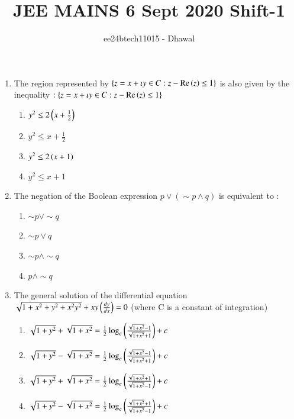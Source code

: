 \documentclass[journal]{IEEEtran}
\theoremstyle{remark}
\begin{document}

\onecolumn

\title{JEE MAINS 6 Sept 2020 Shift-1}
\author{ee24btech11015 - Dhawal}
\maketitle

\renewcommand{\thefigure}{\theenumi}
\renewcommand{\thetable}{\theenumi}

\begin{enumerate}
	\item The region represented by $\left\{ z = x+ \iota y  \in C : z - \text{Re} \left(z\right) \leq 1\right\}$ is also given by the inequality $: \left\{z = x + \iota y \in C : z -\text{Re} \left(z\right) \leq 1\right\}$

\begin{multicols}{4}
\begin{enumerate}
\item $y^2 \leq 2\left(x + \frac{1}{2}\right)$
\item $y^2 \leq x + \frac{1}{2}$
\item $y^2 \leq 2\left(x + 1\right)$
\item $y^2 \leq x + 1$
\end{enumerate}
\end{multicols}

\item  The negation of the Boolean expression $p \lor (\sim p \land q)$ is equivalent to :

\begin{multicols}{4}
\begin{enumerate}
\item $\sim p \lor  \sim q$
\item $\sim p \lor q$
\item $\sim p \land \sim q$
\item $p \land \sim q$
\end{enumerate}
\end{multicols}

\item  The general solution of the differential equation $\sqrt{1+x^2+y^2+x^2y^2}+xy\left(\frac{dy}{dx}\right) = 0$ (where C is a constant of integration)
\begin{enumerate}
\item $\sqrt{1 + y^2} + \sqrt{1 + x^2} = \frac{1}{2} \log_e \left( \frac{\sqrt{1 + x^2} - 1}{\sqrt{1 + x^2} + 1} \right) + c $
\item $\sqrt{1 + y^2} - \sqrt{1 + x^2} = \frac{1}{2} \log_e \left( \frac{\sqrt{1 + x^2} - 1}{\sqrt{1 + x^2} + 1} \right) + c $
\item $\sqrt{1 + y^2} + \sqrt{1 + x^2} = \frac{1}{2} \log_e \left( \frac{\sqrt{1 + x^2} + 1}{\sqrt{1 + x^2} - 1} \right) + c $
\item $\sqrt{1 + y^2} - \sqrt{1 + x^2} = \frac{1}{2} \log_e \left( \frac{\sqrt{1 + x^2} + 1}{\sqrt{1 + x^2} - 1} \right) + c $
\end{enumerate}



\end{enumerate}
\end{document}
